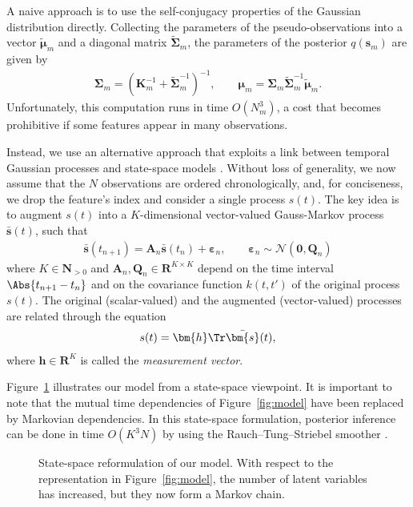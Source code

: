 A naive approach is to use the self-conjugacy properties of the Gaussian distribution directly.
Collecting the parameters of the pseudo-observations into a vector $\tilde{\bm{\mu}}_m$ and a diagonal matrix $\tilde{\bm{\Sigma}}_m$, the parameters of the posterior $q(\bm{s}_m)$ are given by
\begin{align}
\label{eq:batch}
\bm{\Sigma}_m = (\bm{K}_m^{-1} + \tilde{\bm{\Sigma}}_m^{-1})^{-1}, \qquad
\bm{\mu}_m    = \bm{\Sigma}_m \tilde{\bm{\Sigma}}_m^{-1} \tilde{\bm{\mu}}_m.
\end{align}
Unfortunately, this computation runs in time $O(N_m^3)$, a cost that becomes prohibitive if some features appear in many observations.

Instead, we use an alternative approach that exploits a link between temporal Gaussian processes and state-space models \citep{hartikainen2010kalman, reece2010introduction}.
Without loss of generality, we now assume that the $N$ observations are ordered chronologically, and, for conciseness, we drop the feature's index and consider a single process $s(t)$.
The key idea is to augment $s(t)$ into a $K$-dimensional vector-valued Gauss-Markov process $\bar{\bm{s}}(t)$, such that
\begin{align*}
\bar{\bm{s}}(t_{n+1}) = \bm{A}_n \bar{\bm{s}}(t_n) + \bm{\varepsilon}_n,
    \qquad \bm{\varepsilon}_n \sim \mathcal{N}(\bm{0}, \bm{Q}_n)
\end{align*}
where $K \in \mathbf{N}_{>0}$ and $\bm{A}_n, \bm{Q}_n \in \mathbf{R}^{K \times K}$ depend on the time interval $\Abs{t_{n+1} - t_n}$ and on the covariance function $k(t, t')$ of the original process $s(t)$.
The original (scalar-valued) and the augmented (vector-valued) processes are related through the equation
\begin{align*}
s(t) = \bm{h}\Tr \bar{\bm{s}}(t),
\end{align*}
where $\bm{h} \in \mathbf{R}^K$ is called the \emph{measurement vector}.

Figure~\ref{fig:ssm} illustrates our model from a state-space viewpoint.
It is important to note that the mutual time dependencies of Figure~\ref{fig:model} have been replaced by Markovian dependencies.
In this state-space formulation, posterior inference can be done in time $O(K^3 N)$ by using the Rauch--Tung--Striebel smoother \citep{sarkka2013bayesian}.

\begin{figure}[t]
  \centering
  
  \caption{State-space reformulation of our model.
  With respect to the representation in Figure~\ref{fig:model}, the number of latent variables has increased, but they now form a Markov chain.}
  \label{fig:ssm}
\end{figure}

